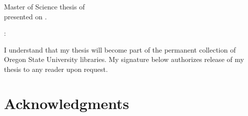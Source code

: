 \begin{flushleft}
  Master of Science thesis of \myname \\
  presented on .

  \vspace{3em}
  :




  \vfill
  I understand that my thesis will become part of the permanent collection
  of Oregon State University libraries. My signature below authorizes release of
  my thesis to any reader upon request.

\end{flushleft}
\clearpage

\chapter*{Acknowledgments}
\pagestyle{plain}


%

\tableofcontents
\clearpage

\listoffigures
\clearpage

\pagestyle{myheadings}
